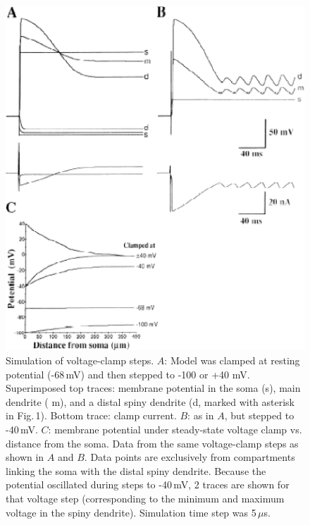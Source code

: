 \documentclass[12pt]{article}
\begin{document}
\clearpage

\begin{figure}[h]
\centering
   \includegraphics[scale=0.75]{figures/Fig.1.13.eps}
   \caption{Simulation of voltage-clamp steps. $A$: Model was clamped at resting potential (-68\,mV) and then stepped to -100 or +40 mV. Superimposed top traces: membrane potential in the soma (s), main dendrite ( m), and a distal spiny dendrite (d, marked with asterisk in Fig.\,1). Bottom trace: clamp current. $B$: as in $A$, but stepped to -40\,mV. $C$: membrane potential under steady-state voltage clamp vs. distance from the soma. Data from the same voltage-clamp steps as shown in $A$ and $B$. Data points are exclusively from compartments linking the soma with the distal spiny dendrite. Because the potential oscillated during steps to -40\,mV, 2 traces are shown for that voltage step (corresponding to the minimum and maximum voltage in the spiny dendrite). Simulation time step was 5\,$\mu$s.}
   \label{fig:DS1.13}
\end{figure}

\clearpage
\end{document}
